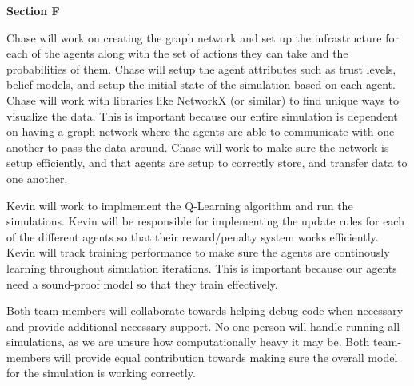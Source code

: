 \documentclass[twoside]{article}
\begin{document}
\textbf{Section F}

Chase will work on creating the graph network and set up the infrastructure for each of the agents along with the set of actions they can take and the probabilities of them. Chase will setup the agent attributes such as trust levels, belief models, and setup the initial state of the simulation based on each agent. Chase will work with libraries like NetworkX (or similar) to find unique ways to visualize the data. This is important because our entire simulation is dependent on having a graph network where the agents are able to communicate with one another to pass the data around. Chase will work to make sure the network is setup efficiently, and that agents are setup to correctly store, and transfer data to one another.

Kevin will work to implmement the Q-Learning algorithm and run the simulations. Kevin will be responsible for implementing the update rules for each of the different agents so that their reward/penalty system works efficiently. Kevin will track training performance to make sure the agents are continously learning throughout simulation iterations. This is important because our agents need a sound-proof model so that they train effectively. 

Both team-members will collaborate towards helping debug code when necessary and provide additional necessary support. No one person will handle running all simulations, as we are unsure how computationally heavy it may be. Both team-members will provide equal contribution towards making sure the overall model for the simulation is working correctly. 
\end{document}
